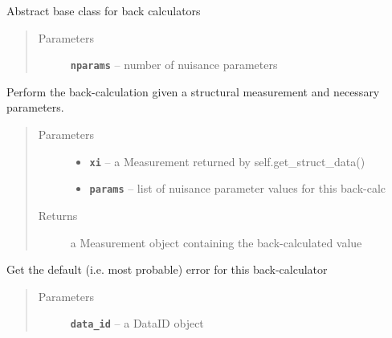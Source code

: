 \documentclass[letterpaper,10pt,english]{sphinxmanual}
\begin{document}
\begin{fulllineitems}
\label{modules:backcalc.BaseBackCalculator}
Abstract base class for back calculators
\begin{quote}\begin{description}
\item[{Parameters}] \leavevmode
\textbf{\texttt{nparams}} -- number of nuisance parameters

\end{description}\end{quote}

\begin{fulllineitems}
\label{modules:backcalc.BaseBackCalculator.back_calc}
Perform the back-calculation given a structural measurement and
necessary parameters.
\begin{quote}\begin{description}
\item[{Parameters}] \leavevmode\begin{itemize}
\item {} 
\textbf{\texttt{xi}} -- a Measurement returned by self.get\_struct\_data()

\item {} 
\textbf{\texttt{params}} -- list of nuisance parameter values for this back-calc

\end{itemize}

\item[{Returns}] \leavevmode
a Measurement object containing the back-calculated value

\end{description}\end{quote}

\end{fulllineitems}


\begin{fulllineitems}
\label{modules:backcalc.BaseBackCalculator.get_default_err}
Get the default (i.e. most probable) error for this back-calculator
\begin{quote}\begin{description}
\item[{Parameters}] \leavevmode
\textbf{\texttt{data\_id}} -- a DataID object


\end{description}
\end{quote}
\end{fulllineitems}
\end{fulllineitems}
\end{document}
